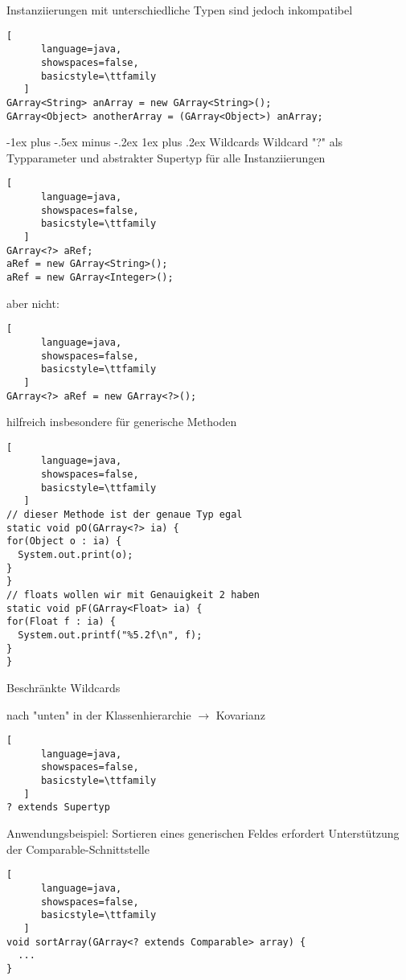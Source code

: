 \documentclass[10pt]{article}
\makeatletter
\renewcommand{\subsubsection}{\@startsection{subsubsection}{3}{0mm}%
                                {-1ex plus -.5ex minus -.2ex}%
                                {1ex plus .2ex}%
                                {\normalfont\small\bfseries}}
\makeatother
\begin{document}
\begin{itemize*}
Instanziierungen mit unterschiedliche Typen sind jedoch inkompatibel
\begin{lstlisting}[
      language=java,
      showspaces=false,
      basicstyle=\ttfamily
   ]
GArray<String> anArray = new GArray<String>();
GArray<Object> anotherArray = (GArray<Object>) anArray;
\end{lstlisting}


\subsubsection{Wildcards}
Wildcard "?" als Typparameter und abstrakter Supertyp für alle Instanziierungen
\begin{lstlisting}[
      language=java,
      showspaces=false,
      basicstyle=\ttfamily
   ]
GArray<?> aRef;
aRef = new GArray<String>();
aRef = new GArray<Integer>();
\end{lstlisting}

aber nicht:
\begin{lstlisting}[
      language=java,
      showspaces=false,
      basicstyle=\ttfamily
   ]
GArray<?> aRef = new GArray<?>();
\end{lstlisting}

hilfreich insbesondere für generische Methoden
\begin{lstlisting}[
      language=java,
      showspaces=false,
      basicstyle=\ttfamily
   ]
// dieser Methode ist der genaue Typ egal
static void pO(GArray<?> ia) {
for(Object o : ia) {
  System.out.print(o);
}
}
// floats wollen wir mit Genauigkeit 2 haben
static void pF(GArray<Float> ia) {
for(Float f : ia) {
  System.out.printf("%5.2f\n", f);
}
}
\end{lstlisting}


Beschränkte Wildcards 
\begin{itemize*}
  \item nach "unten" in der Klassenhierarchie $\rightarrow$ Kovarianz
  \begin{lstlisting}[
      language=java,
      showspaces=false,
      basicstyle=\ttfamily
   ] 
? extends Supertyp 
\end{lstlisting}
  
  Anwendungsbeispiel: Sortieren eines generischen Feldes erfordert Unterstützung der Comparable-Schnittstelle
  \begin{lstlisting}[
      language=java,
      showspaces=false,
      basicstyle=\ttfamily
   ]
void sortArray(GArray<? extends Comparable> array) {
  ...
}
\end{lstlisting}
  

\end{itemize*}
\end{itemize*}
\end{document}
